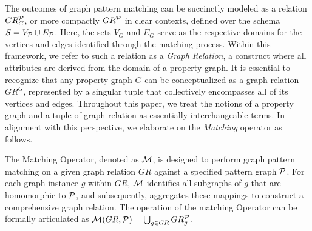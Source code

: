 The outcomes of graph pattern matching can be succinctly modeled as a relation \(GR_G^{\mathcal{P}}\), or more compactly \(GR^{\mathcal{P}}\) in clear contexts, defined over the schema \(S = V_{\mathcal{P}} \cup E_{\mathcal{P}}\). Here, the sets \(V_G\) and \(E_G\) serve as the respective domains for the vertices and edges identified through the matching process. Within this framework, we refer to such a relation as a \emph{Graph Relation}, a construct where all attributes are derived from the domain of a property graph.
It is essential to recognize that any property graph \(G\) can be conceptualized as a graph relation \(GR^G\), represented by a singular tuple that collectively encompasses all of its vertices and edges. Throughout this paper, we treat the notions of a property graph and a tuple of graph relation as essentially interchangeable terms. In alignment with this perspective, we elaborate on the \emph{Matching} operator as follows.



\begin{definition}
    \label{def:matching}
    The Matching Operator, denoted as \(\mathcal{M}\), is designed to perform graph pattern matching on a given graph relation \(GR\) against a specified pattern graph \(\mathcal{P}\). For each graph instance \(g\) within \(GR\), \(\mathcal{M}\) identifies all subgraphs of \(g\) that are homomorphic to \(\mathcal{P}\), and subsequently, aggregates these mappings to construct a comprehensive graph relation. The operation of the matching Operator can be formally articulated as \(\mathcal{M}(GR, \mathcal{P}) = \bigcup_{g \in GR} GR_g^{\mathcal{P}}\).%
\end{definition}

